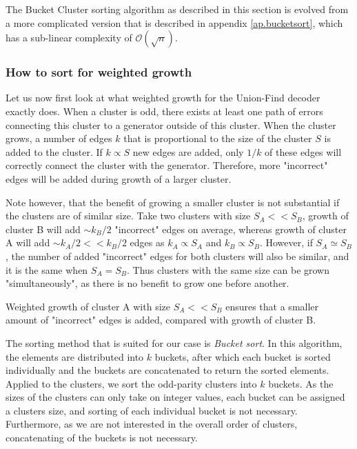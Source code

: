 The Bucket Cluster sorting algorithm as described in this section is evolved from a more complicated version that is described in appendix \ref{ap.bucketsort}, which has a sub-linear complexity of $\mathcal{O}(\sqrt{n})$.

\subsubsection{How to sort for weighted growth}

Let us now first look at what weighted growth for the Union-Find decoder exactly does. When a cluster is odd, there exists at least one path of errors connecting this cluster to a generator outside of this cluster. When the cluster grows, a number of edges $k$ that is proportional to the size of the cluster $S$ is added to the cluster. If $k \propto S$ new edges are added, only $1/k$ of these edges will correctly connect the cluster with the generator. Therefore, more "incorrect" edges will be added during growth of a larger cluster.

Note however, that the benefit of growing a smaller cluster is not substantial if the clusters are of similar size. Take two clusters with size $S_A <<S_B$, growth of cluster B will add $\sim k_B/2$ "incorrect" edges on average, whereas growth of cluster A will add $\sim k_A/2 << k_B/2$ edges as $k_A \propto S_A$ and $k_B \propto S_B$. However, if $S_A \simeq S_B$, the number of added "incorrect" edges for both clusters will also be similar, and it is the same when $S_A = S_B$. Thus clusters with the same size can be grown "simultaneously", as there is no benefit to grow one before another.

\begin{lemma}
  Weighted growth of cluster A with size $S_A << S_B$ ensures that a smaller amount of "incorrect" edges is added, compared with growth of cluster B.
\end{lemma}

The sorting method that is suited for our case is \emph{Bucket sort}. In this algorithm, the elements are distributed into $k$ buckets, after which each bucket is sorted individually and the buckets are concatenated to return the sorted elements. Applied to the clusters, we sort the odd-parity clusters into $k$ buckets. As the sizes of the clusters can only take on integer values, each bucket can be assigned a clusters size, and sorting of each individual bucket is not necessary. Furthermore, as we are not interested in the overall order of clusters, concatenating of the buckets is not necessary.

